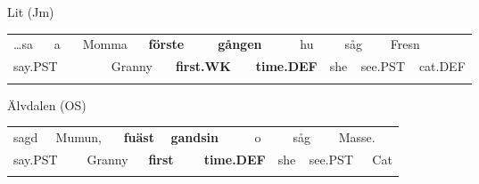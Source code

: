 \begin{styleExLtrTblii}
Lit (Jm)

\end{styleExLtrTblii}

\begin{tabular}{llllllllllllllll}
\lsptoprule
…sa & \multicolumn{2}{l}{a

} & \multicolumn{2}{l}{Momma

} & \multicolumn{2}{l}{{\bfseries förste}

} & \multicolumn{2}{l}{{\bfseries gången}

} & \multicolumn{2}{l}{hu

} & \multicolumn{2}{l}{såg

} & \multicolumn{2}{l}{Fresn

} & \\
\multicolumn{2}{l}{say.PST

} & \multicolumn{2}{l}{} & \multicolumn{2}{l}{Granny

} & \multicolumn{2}{l}{{\bfseries first.WK}

} & \multicolumn{2}{l}{{\bfseries time.DEF}

} & \multicolumn{2}{l}{she

} & \multicolumn{2}{l}{see.PST

} & \multicolumn{2}{l}{cat.DEF

}\\
\lspbottomrule
\end{tabular}

\begin{styleExLtrTblii}
Älvdalen (OS)

\end{styleExLtrTblii}

\begin{tabular}{llllllllllllll}
\lsptoprule
sagd & \multicolumn{2}{l}{Mumun,

} & \multicolumn{2}{l}{{\bfseries fuäst}

} & \multicolumn{2}{l}{{\bfseries gandsin}

} & \multicolumn{2}{l}{o

} & \multicolumn{2}{l}{såg

} & \multicolumn{2}{l}{Masse.

} & \\
\multicolumn{2}{l}{say.PST

} & \multicolumn{2}{l}{Granny

} & \multicolumn{2}{l}{{\bfseries first}

} & \multicolumn{2}{l}{{\bfseries time.DEF}

} & \multicolumn{2}{l}{she

} & \multicolumn{2}{l}{see.PST

} & \multicolumn{2}{l}{Cat

}\\
\lspbottomrule
\end{tabular}

